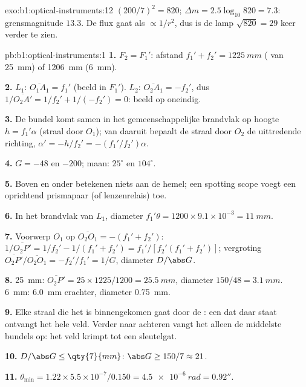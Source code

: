 \begin{solution}{exo:b1:optical-instruments:12}
$(200/7)^2 = 820$; $\Delta m = 2.5\log_{10}820 = 7.3$: grensmagnitude
$13.3$. De flux gaat als $\propto 1/r^2$, dus is de lamp
$\sqrt{820} = 29$ keer verder te zien.
\end{solution}

\begin{solution}{pb:b1:optical-instruments:1}
\textbf{1.} $F_2 = F_1'$: afstand $f_1' + f_2' = \qty{1225}{mm}$
( van \qty{25}{mm}) of \qty{1206}{mm} (\qty{6}{mm}).

\textbf{2.} $L_1$: $\overline{O_1A_1} = f_1'$ (beeld in $F_1'$). $L_2$:
$\overline{O_2A_1} = -f_2'$, dus $1/\overline{O_2A'} = 1/f_2' + 1/(-f_2')
= 0$: beeld op oneindig.

\textbf{3.} De bundel komt samen in het gemeenschappelijke brandvlak op hoogte $h =
f_1'\alpha$ (straal door $O_1$); van daaruit bepaalt de straal door $O_2$
de uittredende richting, $\alpha' = -h/f_2' = -(f_1'/f_2')\alpha$.

\textbf{4.} $G = -48$ en $-200$; maan: $25^\circ$ en $104^\circ$.

\textbf{5.} Boven en onder betekenen niets aan de hemel; een spotting scope
voegt een oprichtend prismapaar (of lenzenrelais) toe.

\textbf{6.} In het brandvlak van $L_1$, diameter $f_1'\theta = 1200 \times
9.1\times10^{-3} = \qty{11}{mm}$.

\textbf{7.} Voorwerp $O_1$ op $\overline{O_2O_1} = -(f_1' + f_2')$:
$1/\overline{O_2P'} = 1/f_2' - 1/(f_1' + f_2') = f_1'/[f_2'(f_1' + f_2')]$;
vergroting $\overline{O_2P'}/\overline{O_2O_1} = -f_2'/f_1' = 1/G$,
diameter $D/\abs G$.

\textbf{8.} \qty{25}{mm}: $\overline{O_2P'} = 25 \times 1225/1200 =
\qty{25.5}{mm}$, diameter $150/48 = \qty{3.1}{mm}$. \qty{6}{mm}:
\qty{6.0}{mm} erachter, diameter \qty{0.75}{mm}.

\textbf{9.} Elke straal die het  is binnengekomen gaat door de
: een  dat daar staat ontvangt het hele veld. Verder naar
achteren vangt het alleen de middelste bundels op: het veld krimpt tot een sleutelgat.

\textbf{10.} $D/\abs G \leq \qty{7}{mm}$: $\abs G \geq 150/7 \approx 21$.

\textbf{11.} $\theta_{\min} = 1.22 \times 5.5\times10^{-7}/0.150 =
\qty{4.5e-6}{rad} = 0.92''$.


\end{solution}
